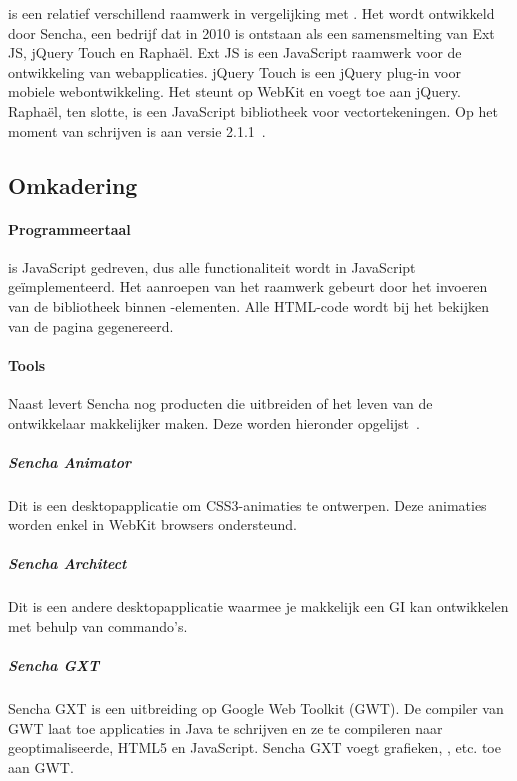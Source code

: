 \st{} is een relatief verschillend raamwerk in vergelijking met \jqm{}.  
Het wordt ontwikkeld door Sencha,  een bedrijf dat in 2010 is ontstaan als een samensmelting van Ext JS,  jQuery Touch en Raphaël.  
Ext JS is een JavaScript raamwerk voor de ontwikkeling van webapplicaties. 
jQuery Touch is een jQuery plug-in voor mobiele webontwikkeling.  
Het steunt op WebKit en voegt  toe aan jQuery.  
Raphaël,  ten slotte,  is een JavaScript bibliotheek voor vectortekeningen. 
Op het moment van schrijven is \st{} aan versie 2.1.1~\cite{Inc.}.  

\subsection{Omkadering}
\paragraph{Programmeertaal}
\st{} is JavaScript gedreven, dus alle functionaliteit wordt in JavaScript geïmplementeerd. 
Het aanroepen van het raamwerk gebeurt door het invoeren van de \st{} bibliotheek binnen -elementen.  
Alle HTML-code wordt bij het bekijken van de pagina gegenereerd.  

\paragraph{Tools}
Naast \st{} levert Sencha nog producten die \st{} uitbreiden of het leven van de ontwikkelaar makkelijker maken.  
Deze worden hieronder opgelijst~\cite{Inc.}.  

\subparagraph{Sencha Animator}
Dit is een desktopapplicatie om CSS3-animaties te ontwerpen.  
Deze animaties worden enkel in WebKit browsers ondersteund.

\subparagraph{Sencha Architect}
Dit is een andere desktopapplicatie waarmee je makkelijk een GI kan ontwikkelen met behulp van  commando's.  

\subparagraph{Sencha GXT}
Sencha GXT is een uitbreiding op Google Web Toolkit (GWT).  
De compiler van GWT laat toe applicaties in Java te schrijven en ze te compileren naar geoptimaliseerde,   HTML5 en JavaScript.  
Sencha GXT voegt grafieken,  , etc. toe aan GWT.

